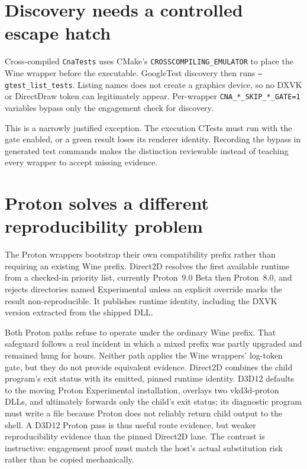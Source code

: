 \section{Discovery needs a controlled escape hatch}

Cross-compiled \texttt{CnaTests} uses CMake's \texttt{CROSSCOMPILING\_EMULATOR} to place the Wine
wrapper before the executable.  GoogleTest discovery then runs
\texttt{--gtest\_list\_tests}.  Listing names does not create a graphics device, so no DXVK or
DirectDraw token can legitimately appear.  Per-wrapper
\texttt{CNA\_*\_SKIP\_*\_GATE=1} variables bypass only the engagement check for discovery.

This is a narrowly justified exception.  The execution CTests must run with the gate enabled,
or a green result loses its renderer identity.  Recording the bypass in generated test commands
makes the distinction reviewable instead of teaching every wrapper to accept missing evidence.

\section{Proton solves a different reproducibility problem}

The Proton wrappers bootstrap their own compatibility prefix rather than requiring an existing
Wine prefix.  Direct2D resolves the first available runtime from a checked-in priority list,
currently Proton~9.0 Beta then Proton~8.0, and rejects directories named Experimental unless an
explicit override marks the result non-reproducible.  It publishes runtime identity, including
the DXVK version extracted from the shipped DLL.

Both Proton paths refuse to operate under the ordinary Wine prefix.  That safeguard follows a
real incident in which a mixed prefix was partly upgraded and remained hung for hours.  Neither
path applies the Wine wrappers' log-token gate, but they do not provide equivalent evidence.
Direct2D combines the child program's exit status with its emitted, pinned runtime identity.
D3D12 defaults to the moving Proton Experimental installation, overlays two vkd3d-proton DLLs,
and ultimately forwards only the child's exit status; its diagnostic program must write a file
because Proton does not reliably return child output to the shell.  A D3D12 Proton pass is thus
useful route evidence, but weaker reproducibility evidence than the pinned Direct2D lane.  The
contrast is instructive: engagement proof must match the host's actual substitution risk rather
than be copied mechanically.

